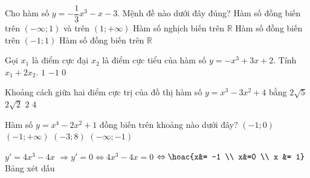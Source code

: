\begin{ex}
	Cho hàm số $y= - \dfrac{1}{3} x^3 - x -3 $. Mệnh đề nào dưới đây đúng?
	\choice
	{Hàm số đồng biến trên $(-\infty; 1)$ và trên $(1; +\infty)$}
	{\True Hàm số nghịch biến trên $\mathbb{R}$}
	{Hàm số đồng biến trên $(-1;1)$}
	{Hàm số đồng biến trên $\mathbb{R}$}
\end{ex}


\begin{ex}
	Gọi $x_1$ là điểm cực đại $x_2$ là điểm cực tiểu của hàm số $y=-x^3+3x+2$. Tính $x_1+2x_2$.
	{$1$}
	{\True $-1$}
	{$0$}
\end{ex}


\begin{ex}
	Khoảng cách giữa hai điểm cực trị của đồ thị hàm số $y=x^3-3x^2+4$ bằng
	\choice
	{\True $2\sqrt{5}$}
	{$2\sqrt{2}$}
	{$2$}
	{$ 4 $}
\end{ex}

\begin{ex}%
	Hàm số $y=x^4-2x^2+1$ đồng biến trên khoảng nào dưới đây?
	\choice
	{\True $(-1;0)$}
	{$(-1;+ \infty)$}
	{$(-3;8)$}
	{$(- \infty ; -1)$}
	\loigiai
	{
		$y'= 4x^3-4x$ $\Rightarrow y'=0 \Leftrightarrow 4x^3-4x=0$ $\Leftrightarrow \hoac{x&= -1 \\ x&=0 \\ x &= 1}$\\
		Bảng xét dấu
		\begin{center}
		\end{center}
	}

\end{ex}

